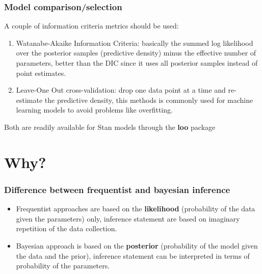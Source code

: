 \documentclass{beamer}
\begin{document}
  \begin{frame}
  \frametitle{\bf Model comparison/selection}
  
  A couple of information criteria metrics should be used:
  
  \begin{enumerate}
   \item Watanabe-Akaike Information Criteria: basically the summed log likelihood over the posterior samples (predictive density) minus the effective number of parameters, better than the DIC since it uses all posterior samples instead of point estimates.
   \item Leave-One Out cross-validation: drop one data point at a time and re-estimate the predictive density, this methods is commonly used for machine learning models to avoid problems like overfitting.
  \end{enumerate}
  
  \vspace*{0.2cm}
  
  Both are readily available for Stan models through the \textbf{loo} package

  
 \end{frame}
 

\section{Why?}
 
  
 \begin{frame}
  \frametitle{\bf Difference between frequentist and bayesian inference}
  
  \begin{itemize}
   \item Frequentist approaches are based on the \textbf{likelihood} (probability of the data given the parameters) only, inference statement are based on imaginary repetition of the data collection.
   \item Bayesian approach is based on the \textbf{posterior} (probability of the model given the data and the prior), inference statement can be interpreted in terms of probability of the parameters.   
  \end{itemize}
 \end{frame}
\end{document}
